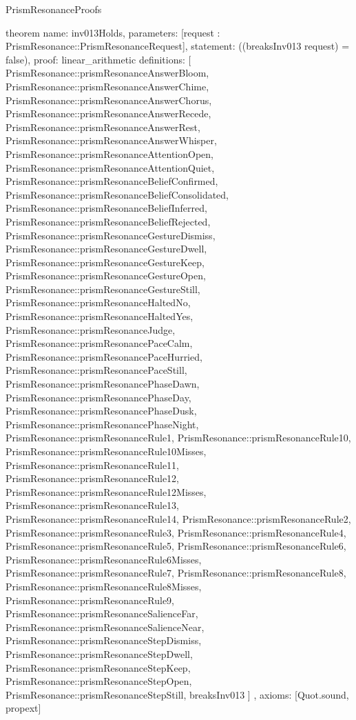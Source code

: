 \begin{lexlean}{PrismResonanceProofs}
\begin{semanticmodule}
theorem{
  name: inv013Holds,
  parameters: [request : PrismResonance::PrismResonanceRequest],
  statement: ((breaksInv013 request) = false),
  proof: linear_arithmetic{
    definitions: [
      PrismResonance::prismResonanceAnswerBloom,
      PrismResonance::prismResonanceAnswerChime,
      PrismResonance::prismResonanceAnswerChorus,
      PrismResonance::prismResonanceAnswerRecede,
      PrismResonance::prismResonanceAnswerRest,
      PrismResonance::prismResonanceAnswerWhisper,
      PrismResonance::prismResonanceAttentionOpen,
      PrismResonance::prismResonanceAttentionQuiet,
      PrismResonance::prismResonanceBeliefConfirmed,
      PrismResonance::prismResonanceBeliefConsolidated,
      PrismResonance::prismResonanceBeliefInferred,
      PrismResonance::prismResonanceBeliefRejected,
      PrismResonance::prismResonanceGestureDismiss,
      PrismResonance::prismResonanceGestureDwell,
      PrismResonance::prismResonanceGestureKeep,
      PrismResonance::prismResonanceGestureOpen,
      PrismResonance::prismResonanceGestureStill,
      PrismResonance::prismResonanceHaltedNo,
      PrismResonance::prismResonanceHaltedYes,
      PrismResonance::prismResonanceJudge,
      PrismResonance::prismResonancePaceCalm,
      PrismResonance::prismResonancePaceHurried,
      PrismResonance::prismResonancePaceStill,
      PrismResonance::prismResonancePhaseDawn,
      PrismResonance::prismResonancePhaseDay,
      PrismResonance::prismResonancePhaseDusk,
      PrismResonance::prismResonancePhaseNight,
      PrismResonance::prismResonanceRule1,
      PrismResonance::prismResonanceRule10,
      PrismResonance::prismResonanceRule10Misses,
      PrismResonance::prismResonanceRule11,
      PrismResonance::prismResonanceRule12,
      PrismResonance::prismResonanceRule12Misses,
      PrismResonance::prismResonanceRule13,
      PrismResonance::prismResonanceRule14,
      PrismResonance::prismResonanceRule2,
      PrismResonance::prismResonanceRule3,
      PrismResonance::prismResonanceRule4,
      PrismResonance::prismResonanceRule5,
      PrismResonance::prismResonanceRule6,
      PrismResonance::prismResonanceRule6Misses,
      PrismResonance::prismResonanceRule7,
      PrismResonance::prismResonanceRule8,
      PrismResonance::prismResonanceRule8Misses,
      PrismResonance::prismResonanceRule9,
      PrismResonance::prismResonanceSalienceFar,
      PrismResonance::prismResonanceSalienceNear,
      PrismResonance::prismResonanceStepDismiss,
      PrismResonance::prismResonanceStepDwell,
      PrismResonance::prismResonanceStepKeep,
      PrismResonance::prismResonanceStepOpen,
      PrismResonance::prismResonanceStepStill,
      breaksInv013
    ]
  },
  axioms: [Quot.sound, propext]
}


\end{semanticmodule}
\end{lexlean}
